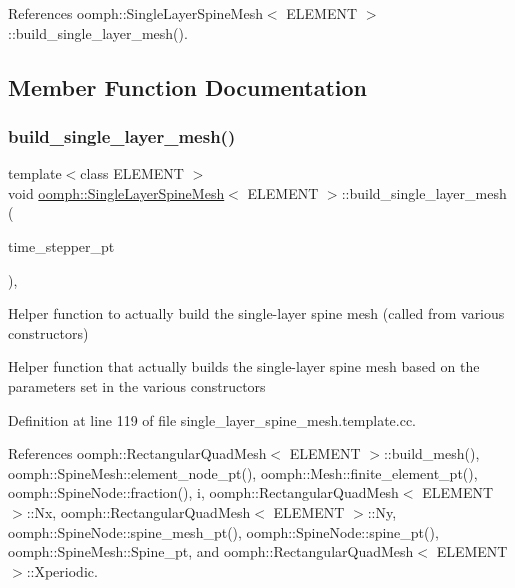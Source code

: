 References oomph\+::\+Single\+Layer\+Spine\+Mesh$<$ E\+L\+E\+M\+E\+N\+T $>$\+::build\+\_\+single\+\_\+layer\+\_\+mesh().



\subsection{Member Function Documentation}
\mbox{\label{classoomph_1_1SingleLayerSpineMesh_a6829fa8216137c0e2f5eb40b389dda35}} 
\subsubsection{\texorpdfstring{build\+\_\+single\+\_\+layer\+\_\+mesh()}{build\_single\_layer\_mesh()}}
{\footnotesize\ttfamily template$<$class E\+L\+E\+M\+E\+NT $>$ \\
void \hyperlink{classoomph_1_1SingleLayerSpineMesh}{oomph\+::\+Single\+Layer\+Spine\+Mesh}$<$ E\+L\+E\+M\+E\+NT $>$\+::build\+\_\+single\+\_\+layer\+\_\+mesh (\begin{DoxyParamCaption}\item[{\hyperlink{classoomph_1_1TimeStepper}{Time\+Stepper} $\ast$}]{time\+\_\+stepper\+\_\+pt }\end{DoxyParamCaption})\hspace{0.3cm}{\ttfamily [protected]}, {\ttfamily [virtual]}}



Helper function to actually build the single-\/layer spine mesh (called from various constructors) 

Helper function that actually builds the single-\/layer spine mesh based on the parameters set in the various constructors 

Definition at line 119 of file single\+\_\+layer\+\_\+spine\+\_\+mesh.\+template.\+cc.



References oomph\+::\+Rectangular\+Quad\+Mesh$<$ E\+L\+E\+M\+E\+N\+T $>$\+::build\+\_\+mesh(), oomph\+::\+Spine\+Mesh\+::element\+\_\+node\+\_\+pt(), oomph\+::\+Mesh\+::finite\+\_\+element\+\_\+pt(), oomph\+::\+Spine\+Node\+::fraction(), i, oomph\+::\+Rectangular\+Quad\+Mesh$<$ E\+L\+E\+M\+E\+N\+T $>$\+::\+Nx, oomph\+::\+Rectangular\+Quad\+Mesh$<$ E\+L\+E\+M\+E\+N\+T $>$\+::\+Ny, oomph\+::\+Spine\+Node\+::spine\+\_\+mesh\+\_\+pt(), oomph\+::\+Spine\+Node\+::spine\+\_\+pt(), oomph\+::\+Spine\+Mesh\+::\+Spine\+\_\+pt, and oomph\+::\+Rectangular\+Quad\+Mesh$<$ E\+L\+E\+M\+E\+N\+T $>$\+::\+Xperiodic.



